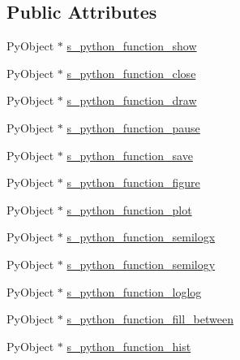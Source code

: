 \subsection*{Public Attributes}
\begin{DoxyCompactItemize}
\item 
Py\+Object $\ast$ \mbox{\hyperlink{structmatplotlibcpp_1_1detail_1_1__interpreter_a7630f4b6c75cb15e0979f94b9c84bc1e}{s\+\_\+python\+\_\+function\+\_\+show}}
\item 
Py\+Object $\ast$ \mbox{\hyperlink{structmatplotlibcpp_1_1detail_1_1__interpreter_a43f3de18936dd4d4ffef3046b64d686e}{s\+\_\+python\+\_\+function\+\_\+close}}
\item 
Py\+Object $\ast$ \mbox{\hyperlink{structmatplotlibcpp_1_1detail_1_1__interpreter_a3c4981fa6eea6f2bfc9bb2e685109032}{s\+\_\+python\+\_\+function\+\_\+draw}}
\item 
Py\+Object $\ast$ \mbox{\hyperlink{structmatplotlibcpp_1_1detail_1_1__interpreter_ad4cc1ddd59ab9f4008269ade1a219ffa}{s\+\_\+python\+\_\+function\+\_\+pause}}
\item 
Py\+Object $\ast$ \mbox{\hyperlink{structmatplotlibcpp_1_1detail_1_1__interpreter_a73bc4fbc6e14bf0df3dcde3554f7ac03}{s\+\_\+python\+\_\+function\+\_\+save}}
\item 
Py\+Object $\ast$ \mbox{\hyperlink{structmatplotlibcpp_1_1detail_1_1__interpreter_a5d283724b9e24217b5f4aef9950789fa}{s\+\_\+python\+\_\+function\+\_\+figure}}
\item 
Py\+Object $\ast$ \mbox{\hyperlink{structmatplotlibcpp_1_1detail_1_1__interpreter_a57d34acc4f358c9b16a352227b7d691d}{s\+\_\+python\+\_\+function\+\_\+plot}}
\item 
Py\+Object $\ast$ \mbox{\hyperlink{structmatplotlibcpp_1_1detail_1_1__interpreter_ac2bda54e2d051328d7dcd62d825b2eac}{s\+\_\+python\+\_\+function\+\_\+semilogx}}
\item 
Py\+Object $\ast$ \mbox{\hyperlink{structmatplotlibcpp_1_1detail_1_1__interpreter_a3aec514f70fba364c7315d4bafe01a54}{s\+\_\+python\+\_\+function\+\_\+semilogy}}
\item 
Py\+Object $\ast$ \mbox{\hyperlink{structmatplotlibcpp_1_1detail_1_1__interpreter_a725ff094feb0b74c0ab70038405e26ce}{s\+\_\+python\+\_\+function\+\_\+loglog}}
\item 
Py\+Object $\ast$ \mbox{\hyperlink{structmatplotlibcpp_1_1detail_1_1__interpreter_af9e80729f91e2295b88e6ed5788652c0}{s\+\_\+python\+\_\+function\+\_\+fill\+\_\+between}}
\item 
Py\+Object $\ast$ \mbox{\hyperlink{structmatplotlibcpp_1_1detail_1_1__interpreter_a1f1e3b067a154cf2e588a198f192bb24}{s\+\_\+python\+\_\+function\+\_\+hist}}

\end{DoxyCompactItemize}

